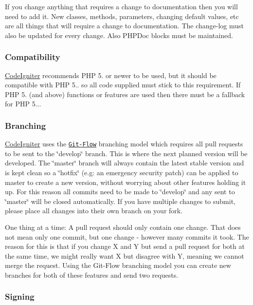 If you change anything that requires a change to documentation then you will need to add it. New classes, methods, parameters, changing default values, etc are all things that will require a change to documentation. The change-\/log must also be updated for every change. Also P\+H\+P\+Doc blocks must be maintained.

\subsubsection*{Compatibility}

\hyperlink{namespace_code_igniter}{Code\+Igniter} recommends P\+H\+P 5. or newer to be used, but it should be compatible with P\+H\+P 5.. so all code supplied must stick to this requirement. If P\+H\+P 5. (and above) functions or features are used then there must be a fallback for P\+H\+P 5...

\subsubsection*{Branching}

\hyperlink{namespace_code_igniter}{Code\+Igniter} uses the \href{http://nvie.com/posts/a-successful-git-branching-model/}{\tt Git-\/\+Flow} branching model which requires all pull requests to be sent to the \char`\"{}develop\char`\"{} branch. This is where the next planned version will be developed. The \char`\"{}master\char`\"{} branch will always contain the latest stable version and is kept clean so a \char`\"{}hotfix\char`\"{} (e.\+g\+: an emergency security patch) can be applied to master to create a new version, without worrying about other features holding it up. For this reason all commits need to be made to \char`\"{}develop\char`\"{} and any sent to \char`\"{}master\char`\"{} will be closed automatically. If you have multiple changes to submit, please place all changes into their own branch on your fork.

One thing at a time\+: A pull request should only contain one change. That does not mean only one commit, but one change -\/ however many commits it took. The reason for this is that if you change X and Y but send a pull request for both at the same time, we might really want X but disagree with Y, meaning we cannot merge the request. Using the Git-\/\+Flow branching model you can create new branches for both of these features and send two requests.

\subsubsection*{Signing}

